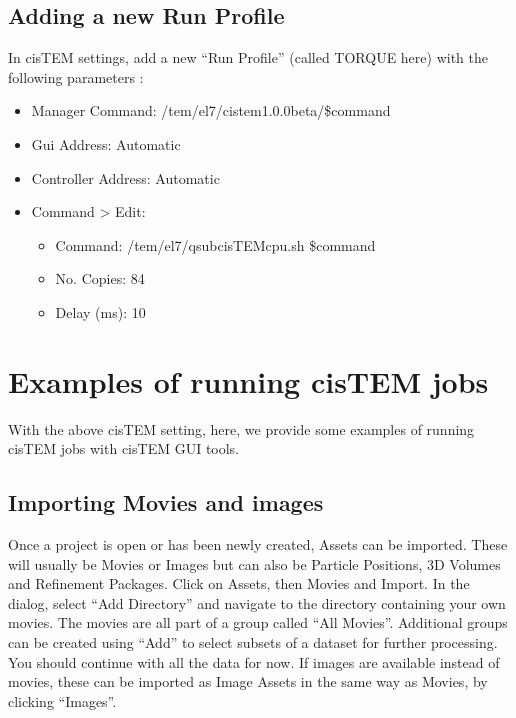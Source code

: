 \documentclass[a4paper,11pt,english]{sphinxmanual}
\begin{document}
\subsection{Adding a new Run Profile}
\label{\detokenize{cisTEM:adding-a-new-run-profile}}
\sphinxAtStartPar
In cisTEM settings, add a new “Run Profile” (called TORQUE here) with the following parameters :
\begin{itemize}
\item {} 
\sphinxAtStartPar
Manager Command: /tem/el7/cistem\sphinxhyphen{}1.0.0\sphinxhyphen{}beta/\$command

\item {} 
\sphinxAtStartPar
Gui Address: Automatic

\item {} 
\sphinxAtStartPar
Controller Address: Automatic

\item {} 
\sphinxAtStartPar
Command \sphinxhyphen{}> Edit:
\begin{itemize}
\item {} 
\sphinxAtStartPar
Command: /tem/el7/qsub\sphinxhyphen{}cisTEM\sphinxhyphen{}cpu.sh  \$command

\item {} 
\sphinxAtStartPar
No. Copies: 84

\item {} 
\sphinxAtStartPar
Delay (ms): 10

\end{itemize}

\end{itemize}



\section{Examples of running cisTEM jobs}
\label{\detokenize{cisTEM:examples-of-running-cistem-jobs}}
\sphinxAtStartPar
With the above cisTEM setting, here, we provide some examples of running cisTEM jobs with cisTEM GUI tools.


\subsection{Importing Movies and images}
\label{\detokenize{cisTEM:importing-movies-and-images}}
\sphinxAtStartPar
Once a project is open or has been newly created, Assets can be imported. These will usually be Movies or Images but can also be Particle Positions, 3D Volumes and Refinement Packages.
Click on Assets, then Movies and Import. In the dialog, select “Add Directory” and navigate to the directory containing your own movies.
The movies are all part of a group called “All Movies”. Additional groups can be created using “Add” to select subsets of a dataset for further processing.
You should continue with all the data for now. If images are available instead of movies,
these can be imported as Image Assets in the same way as Movies, by clicking “Images”.
\end{document}
